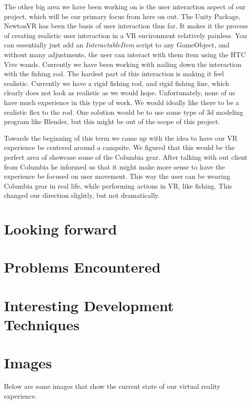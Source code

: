 \documentclass[10pt,journal,compsoc,onecolumn, draftclsnofoot]{IEEEtran}
\begin{document}
The other big area we have been working on is the user interaction aspect of our project, which will be our primary focus from here on out.
The Unity Package, NewtonVR has been the basis of user interaction thus far.
It makes it the process of creating realistic user interaction in a VR environment relatively painless.
You can essentially just add an \textit{InteractableItem} script to any GameObject, and without many adjustments, the user can interact with them item using the HTC Vive wands.
Currently we have been working with nailing down the interaction with the fishing rod.
The hardest part of this interaction is making it feel realistic.
Currently we have a rigid fishing rod, and rigid fishing line, which clearly does not look as realistic as we would hope.
Unfortunately, none of us have much experience in this type of work.
We would ideally like there to be a realistic flex to the rod.
One solution would be to use some type of 3d modeling program like Blender, but this might be out of the scope of this project.

Towards the beginning of this term we came up with the idea to have our VR experience be centered around a campsite.
We figured that this would be the perfect area of showcase some of the Columbia gear.
After talking with out client from Columbia he informed us that it might make more sense to have the experience be focused on user movement.
This way the user can be wearing Columbia gear in real life, while performing actions in VR, like fishing.
This changed our direction slightly, but not dramatically.

\section{Looking forward}

\section{Problems Encountered}

\section{Interesting Development Techniques}

\section{Images}
Below are some images that show the current state of our virtual reality experience.
\end{document}
